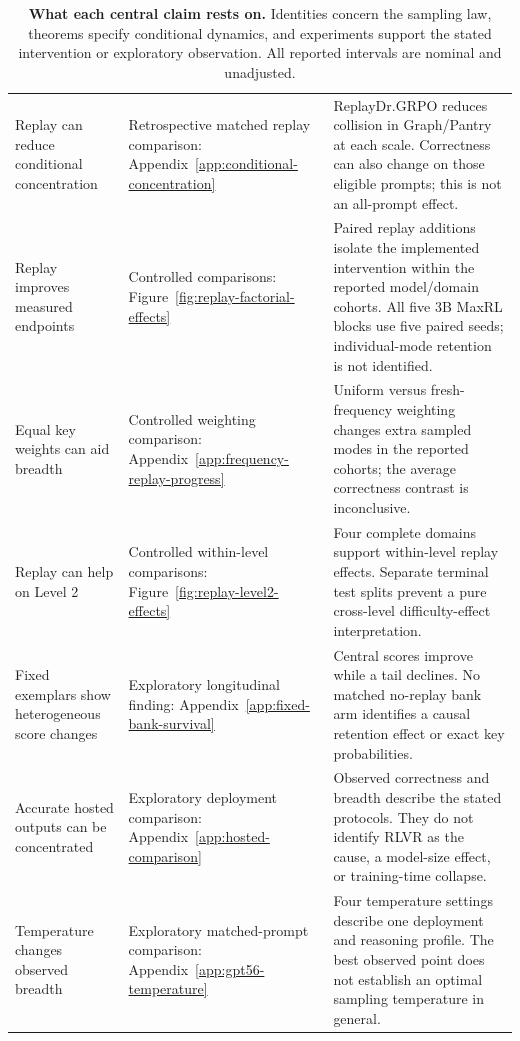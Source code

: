 \documentclass{article}
\newcommand{\1}{\mathbf 1}
\theoremstyle{remark}
\theoremstyle{definition}
\theoremstyle{plain}
\begin{document}
\begin{table}[H]
\begin{tabularx}{\linewidth}{@{}p{.21\linewidth}p{.22\linewidth}X@{}}
Replay can reduce conditional concentration & Retrospective matched replay comparison:
Appendix~\ref{app:conditional-concentration} &
ReplayDr.GRPO reduces collision in Graph/Pantry at each scale. Correctness
can also change on those eligible prompts; this is not an all-prompt effect. \\
Replay improves measured endpoints & Controlled comparisons:
Figure~\ref{fig:replay-factorial-effects} &
Paired replay additions isolate the implemented intervention within the
reported model/domain cohorts. All five 3B MaxRL blocks use five paired
seeds; individual-mode retention is not identified. \\
Equal key weights can aid breadth & Controlled weighting comparison:
Appendix~\ref{app:frequency-replay-progress} &
Uniform versus fresh-frequency weighting changes extra sampled modes in the
reported cohorts; the average correctness contrast is inconclusive. \\
Replay can help on Level 2 & Controlled within-level comparisons:
Figure~\ref{fig:replay-level2-effects} &
Four complete domains support within-level replay effects. Separate terminal
test splits prevent a pure cross-level difficulty-effect interpretation. \\
Fixed exemplars show heterogeneous score changes & Exploratory longitudinal finding:
Appendix~\ref{app:fixed-bank-survival} &
Central scores improve while a tail declines. No matched no-replay bank arm
identifies a causal retention effect or exact key probabilities. \\
Accurate hosted outputs can be concentrated & Exploratory deployment comparison:
Appendix~\ref{app:hosted-comparison} &
Observed correctness and breadth describe the stated protocols. They do not
identify RLVR as the cause, a model-size effect, or training-time collapse. \\
Temperature changes observed breadth & Exploratory matched-prompt comparison:
Appendix~\ref{app:gpt56-temperature} &
Four temperature settings describe one deployment and reasoning profile.
The best observed point does not establish an optimal sampling temperature in general. \\
\bottomrule
\end{tabularx}
\caption{\textbf{What each central claim rests on.} Identities concern the
sampling law, theorems specify conditional dynamics, and experiments support
the stated intervention or exploratory observation. All reported intervals
are nominal and unadjusted.}
\label{tab:claim-basis}
\end{table}
\end{document}
